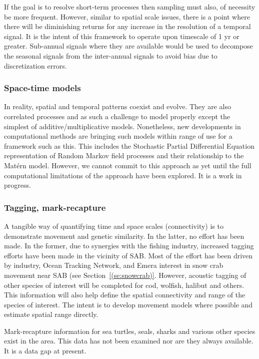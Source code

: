 \documentclass[letterpaper,portrait,11pt]{scrartcl}
\numberwithin{equation}{section}		%
\numberwithin{figure}{section}		%
\numberwithin{table}{section}				%
\begin{document}
If the goal is to resolve short-term processes then sampling must also, of necessity be more frequent. However, similar to spatial scale issues, there is a point where there will be diminishing returns for any increase in the resolution of a temporal signal. It is the intent of this framework to operate upon timescale of 1 yr or greater. Sub-annual signals where they are available would be used to decompose the seasonal signals from the inter-annual signals to avoid bias due to discretization errors. 

\subsubsection{Space-time models}

In reality, spatial and temporal patterns coexist and evolve. They are also correlated processes and as such a challenge to model properly except the simplest of additive/multiplicative models. Nonetheless, new developments in computational methods are bringing such models within range of use for a framework such as this. This includes the Stochastic Partial Differential Equation representation of Random Markov field processes and their relationship to the Mat\'{e}rn model. However, we cannot commit to this approach as yet until the full computational limitations of the approach have been explored. It is a work in progress.


\subsubsection{Tagging, mark-recapture}

A tangible way of quantifying time and space scales (connectivity) is to demonstrate movement and genetic similarity. In the latter, no effort has been made.  In the former, due to synergies with the fishing industry, increased tagging efforts have been made in the vicinity of SAB. Most of the effort has been driven by industry, Ocean Tracking Network, and Emera interest in snow crab movement near SAB (see Section~\ref{(se:snowcrab)}. However, acoustic tagging of other species of interest will be completed for cod, wolfish, halibut and others. This information will also help define the spatial connectivity and range of the species of interest. The intent is to develop movement models where possible and estimate spatial range directly.  

Mark-recapture information for sea turtles, seals, sharks and various other species exist in the area. This data has not been examined nor are they always available. It is a data gap at present. 
\end{document}
